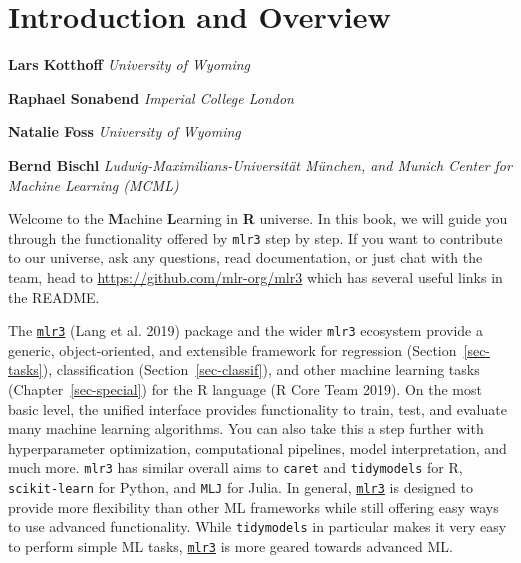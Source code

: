 \hypertarget{sec-introduction}{%
\chapter{Introduction and Overview}\label{sec-introduction}}

\vspace{-15mm}

\textbf{Lars Kotthoff} \newline  \emph{University of Wyoming}

\textbf{Raphael Sonabend} \newline  \emph{Imperial College London}

\textbf{Natalie Foss} \newline  \emph{University of Wyoming}

\textbf{Bernd Bischl} \newline  \emph{Ludwig-Maximilians-Universität
München, and Munich Center for Machine Learning (MCML)}
\newline \newline 

Welcome to the \textbf{M}achine \textbf{L}earning in \textbf{R}
universe. In this book, we will guide you through the functionality
offered by \texttt{mlr3} step by step. If you want to contribute to our
universe, ask any questions, read documentation, or just chat with the
team, head to \url{https://github.com/mlr-org/mlr3} which has several
useful links in the README.

The \href{https://mlr3.mlr-org.com}{\texttt{mlr3}}
(Lang et al. 2019) package and the wider \texttt{mlr3} ecosystem provide
a generic, object-oriented, and
extensible framework for regression
(Section~\ref{sec-tasks}), classification
(Section~\ref{sec-classif}), and other machine learning
tasks (Chapter~\ref{sec-special}) for the R language (R
Core Team 2019). On the most basic level, the unified interface provides
functionality to train, test, and evaluate many machine learning
algorithms. You can also take this a step further with hyperparameter
optimization, computational pipelines, model interpretation, and much
more. \texttt{mlr3} has similar overall aims to \texttt{caret} and
\texttt{tidymodels} for R, \texttt{scikit-learn} for Python, and
\texttt{MLJ} for Julia. In general,
\href{https://mlr3.mlr-org.com}{\texttt{mlr3}} is
designed to provide more flexibility than other ML frameworks while
still offering easy ways to use advanced functionality. While
\texttt{tidymodels} in particular makes it very easy to perform simple
ML tasks,
\href{https://mlr3.mlr-org.com}{\texttt{mlr3}} is
more geared towards advanced ML.

